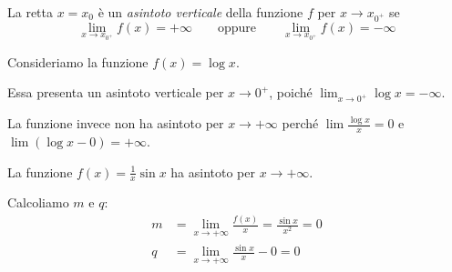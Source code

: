 \begin{definition}
La retta $x = x_0$ è un \emph{asintoto verticale} della funzione $f$ per $x \to x_{0^+}$ se
\begin{equation*}
\lim_{x \to x_{0^+}} f(x) = +\infty \qquad \text{oppure} \qquad \lim_{x \to x_{0^+}} f(x) = -\infty
\end{equation*}
\end{definition}

\begin{example}
Consideriamo la funzione $f(x) = \log x$.

\begin{center}
\end{center}


Essa presenta un asintoto verticale per $x \to 0^+$, poiché $\lim_{x \to 0^+} \log x = -\infty$.

La funzione invece non ha asintoto per $x \to +\infty$ perché $\lim \frac{\log x}{x} = 0$ e $\lim (\log x - 0) = +\infty$.
\end{example}

\begin{example}
La funzione $f(x) = \frac{1}{x} \sin x$ ha asintoto per $x \to +\infty$.

\begin{center}
\end{center}

Calcoliamo $m$ e $q$:
\begin{align*}
m &= \lim_{x \to +\infty} \frac{f(x)}{x} = \frac{\sin x}{x^2} = 0 \\
q &= \lim_{x \to +\infty} \frac{\sin x}{x} - 0 = 0
\end{align*}
\end{example}

